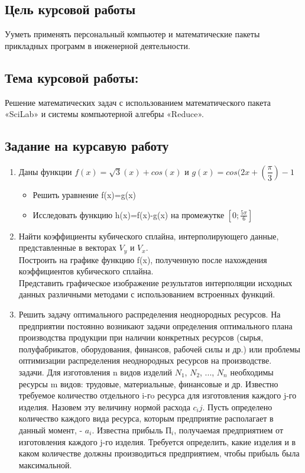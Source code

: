 \documentclass[russian,utf8,nocolumnxxxi,nocolumnxxxii]{eskdtext}
\begin{document}
\newpage
 \subsection{Цель курсовой работы}
Ууметь применять персональный компьютер и математические пакеты прикладных программ в инженерной деятельности.
\subsection{Тема курсовой работы:}
Решение математических задач с использованием математического пакета «SciLab» и системы компьютерной алгебры «Reduce».

\subsection{Задание на курсавую работу}

\begin{enumerate}
\item Даны функции $f(x)=\sqrt{3}(x)+cos(x)$ и $g(x)=cos(2x+(\dfrac{\pi}{3})-1$
\begin{itemize}
  \item Решить уравнение f(x)=g(x)
  \item Исследовать функцию h(x)=f(x)-g(x) на промежутке $[0;\frac{5\pi}{6}]$
\end{itemize}
\item Найти коэффициенты кубического сплайна, интерполирующего данные, представленные в векторах $V_y$ и $V_x$.
\\Построить на графике функцию f(x), полученную после нахождения коэффициентов кубического сплайна.
\\Представить графическое изображение результатов интерполяции исходных данных различными методами с использованием встроенных функций.
\item Решить задачу оптимального распределения неоднородных ресурсов. На предприятии постоянно возникают задачи определения оптимального плана производства продукции при наличии конкретных ресурсов (сырья, полуфабрикатов, оборудования, финансов, рабочей силы и др.) или проблемы оптимизации распределения неоднородных ресурсов на производстве.
\\{ задачи.}  Для изготовления n видов изделий $N_1$, $N_2$, ..., $N_n$ необходимы ресурсы m видов: трудовые, материальные, финансовые и др. Известно требуемое количество отдельного i-гo ресурса для изготовления каждого j-го изделия. Назовем эту величину нормой расхода  $c_ij$. Пусть определено количество каждого вида ресурса, которым предприятие располагает в данный момент, - $a_i$. Известна прибыль $П_i$, получаемая предприятием от изготовления каждого j-го изделия. Требуется определить, какие изделия и в каком количестве должны производиться предприятием, чтобы прибыль была максимальной.
\end{enumerate}
\end{document}
